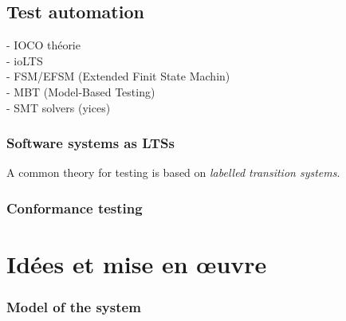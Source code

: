 \documentclass[a4paper]{report}
\begin{document}
\section*{Test automation}
- IOCO théorie\\
- ioLTS\\
- FSM/EFSM (Extended Finit State Machin)\\
- MBT (Model-Based Testing)\\
- SMT solvers (yices)\\

\subsection*{Software systems as LTSs}
A common theory for testing is based on \textit{labelled transition systems}.
\subsection*{Conformance testing}





\chapter*{Idées et mise en œuvre}

\subsection*{Model of the system}
\end{document}
